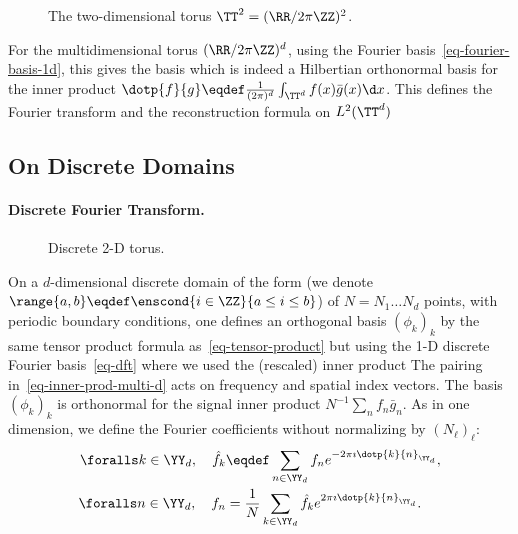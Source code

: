 \begin{figure}[tbp]
\centering
{}
\caption{The two-dimensional torus $\TT^2=(\RR/2\pi\ZZ)^2$.}
\label{fig-review-fourier-torus}
\end{figure}
For the multidimensional torus $(\RR/2\pi\ZZ)^d$, using the Fourier basis~\eqref{eq-fourier-basis-1d}, this gives the basis
which is indeed a Hilbertian orthonormal basis for the inner product $\dotp{f}{g} \eqdef \frac{1}{(2\pi)^d} \int_{\TT^d} f(x)\bar g(x)\d x$. 
%
This defines the Fourier transform and the reconstruction formula on $L^2(\TT^d)$

\subsection{On Discrete Domains}
\label{sec-fft-2d}

\paragraph{Discrete Fourier Transform.}

\begin{figure}[tbp]
\centering
{}
\caption{Discrete 2-D torus.}
\label{fig-review-fourier-torus-discrete}
\end{figure}
On a $d$-dimensional discrete domain of the form
(we denote $\range{a,b} \eqdef \enscond{i \in \ZZ}{a \leq i \leq b}$)
of $N=N_1\ldots N_d$ points, with periodic boundary conditions, one defines an orthogonal basis $(\phi_k)_k$ by the same tensor product formula as~\eqref{eq-tensor-product} but using the 1-D discrete Fourier basis~\eqref{eq-dft}
where we used the (rescaled) inner product
The pairing in~\eqref{eq-inner-prod-multi-d} acts on frequency and spatial index vectors. The basis $(\phi_k)_k$ is orthonormal for the signal inner product $N^{-1}\sum_n f_n\bar g_n$. As in one dimension, we define the Fourier coefficients without normalizing by $(N_\ell)_\ell$:
\begin{align*}
	\foralls k \in \YY_d, \quad 
	\hat f_k &\eqdef \sum_{n \in \YY_d} f_n e^{-2\pi\imath\dotp{k}{n}_{\YY_d}}, \\
	\foralls n \in \YY_d, \quad 
	f_n &= \frac{1}{N} \sum_{k \in \YY_d} \hat f_k e^{2\pi\imath\dotp{k}{n}_{\YY_d}}.
\end{align*}



